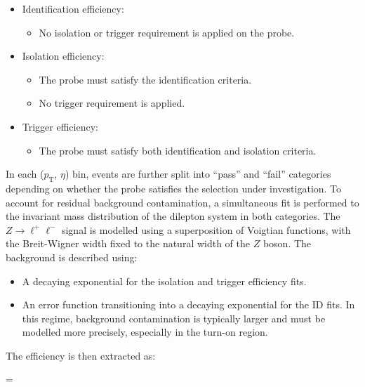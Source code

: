 \begin{itemize}
    \item Identification efficiency:
    \begin{itemize}
        \item No isolation or trigger requirement is applied on the probe.
    \end{itemize}
    
    \item Isolation efficiency:
    \begin{itemize}
        \item The probe must satisfy the identification criteria.
        \item No trigger requirement is applied.
    \end{itemize}

    \item Trigger efficiency:
    \begin{itemize}
        \item The probe must satisfy both identification and isolation criteria.
    \end{itemize}
\end{itemize}

In each ($p_{\mathrm{T}}$, $\eta$) bin, events are further split into ``pass'' and ``fail'' categories depending on whether the probe satisfies the selection under investigation. To account for residual background contamination, a simultaneous fit is performed to the invariant mass distribution of the dilepton system in both categories. The $ Z\rightarrow\ell^+\ell^-$ signal is modelled using a superposition of Voigtian functions, with the Breit-Wigner width fixed to the natural width of the $Z$ boson. The background is described using:

\begin{itemize}
    \item A decaying exponential for the isolation and trigger efficiency fits.
    \item An error function transitioning into a decaying exponential for the ID fits. In this regime, background contamination is typically larger and must be modelled more precisely, especially in the turn-on region.
\end{itemize}

The efficiency is then extracted as:

\begin{equation_pad}
    \epsilon = 
\end{equation_pad}

